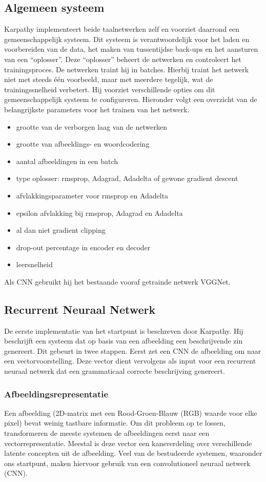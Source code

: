 \subsection{Algemeen systeem}
Karpathy implementeert beide taalnetwerken zelf en voorziet daarrond een gemeenschappelijk systeem. Dit systeem is verantwoordelijk voor het laden en voorbereiden van de data, het maken van tussentijdse back-ups en het aansturen van een ``oplosser''. Deze ``oplosser'' beheert de netwerken en controleert het trainingsproces. De netwerken traint hij in batches. Hierbij traint het netwerk niet met steeds \'e\'en voorbeeld, maar met meerdere tegelijk, wat de trainingssnelheid verbetert. 
Hij voorziet verschillende opties om dit gemeenschappelijk systeem te configureren. Hieronder volgt een overzicht van de belangrijkste parameters voor het trainen van het netwerk.
\begin{itemize}
	\item grootte van de verborgen laag van de netwerken
	\item grootte van afbeeldings- en woordcodering
	\item aantal afbeeldingen in een batch
	\item type oplosser: rmsprop, Adagrad, Adadelta of gewone gradient descent
	\item afvlakkingsparameter voor rmsprop en Adadelta
	\item epsilon afvlakking bij rmsprop, Adagrad en Adadelta
	\item al dan niet gradient clipping
	\item drop-out percentage in encoder en decoder
	\item leersnelheid
\end{itemize}
Als CNN gebruikt hij het bestaande vooraf getrainde netwerk VGGNet.

\subsection{Recurrent Neuraal Netwerk}
\label{sec:rnn_methodology}
De eerste implementatie van het startpunt is beschreven door Karpathy\cite{Karpathy2015}. Hij beschrijft een systeem dat op basis van een afbeelding een beschrijvende zin genereert. Dit gebeurt in twee stappen. Eerst zet een CNN de afbeelding om naar een vectorvoorstelling. Deze vector dient vervolgens als input voor een recurrent neuraal netwerk dat een grammaticaal correcte beschrijving genereert.

\subsubsection{Afbeeldingsrepresentatie}
\label{sec:usedcnn}
Een afbeelding (2D-matrix met een Rood-Groen-Blauw (RGB) waarde voor elke pixel) bevat weinig tastbare informatie. Om dit probleem op te lossen, transformeren de meeste systemen de afbeeldingen eerst naar een vectorrepresentatie. Meestal is deze vector een kansverdeling over verschillende latente concepten uit de afbeelding. Veel van de bestudeerde systemen, waaronder ons startpunt, maken hiervoor gebruik van een convolutioneel neuraal netwerk (CNN).

